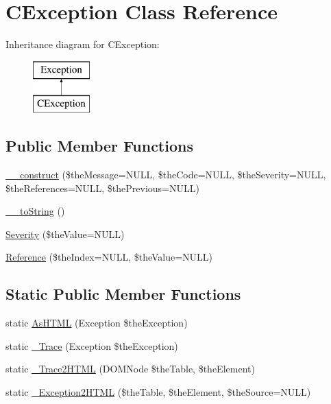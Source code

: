 \hypertarget{class_c_exception}{\section{C\-Exception Class Reference}
\label{class_c_exception}
}
Inheritance diagram for C\-Exception\-:\begin{figure}[H]
\begin{center}
\leavevmode
\includegraphics[height=2.000000cm]{class_c_exception}
\end{center}
\end{figure}
\subsection*{Public Member Functions}
\begin{DoxyCompactItemize}
\item 
\hyperlink{class_c_exception_aea9f2ae76b6058652dfb672ce1a78507}{\-\_\-\-\_\-construct} (\$the\-Message=N\-U\-L\-L, \$the\-Code=N\-U\-L\-L, \$the\-Severity=N\-U\-L\-L, \$the\-References=N\-U\-L\-L, \$the\-Previous=N\-U\-L\-L)
\item 
\hyperlink{class_c_exception_a06b1b207799f8a8ca27bc12d1be82b07}{\-\_\-\-\_\-to\-String} ()
\item 
\hyperlink{class_c_exception_a2bef90da8a35e80dda8072d4f748ec20}{Severity} (\$the\-Value=N\-U\-L\-L)
\item 
\hyperlink{class_c_exception_abcbd46a262790fcbe3493e30a6418821}{Reference} (\$the\-Index=N\-U\-L\-L, \$the\-Value=N\-U\-L\-L)
\end{DoxyCompactItemize}
\subsection*{Static Public Member Functions}
\begin{DoxyCompactItemize}
\item 
static \hyperlink{class_c_exception_a99be238dee92094374995eebe54df6a8}{As\-H\-T\-M\-L} (Exception \$the\-Exception)
\item 
static \hyperlink{class_c_exception_ad5f92d9c5d11443ce4b69aec6a8484d5}{\-\_\-\-Trace} (Exception \$the\-Exception)
\item 
static \hyperlink{class_c_exception_a643b0ad0d3d4faba071968c953d639af}{\-\_\-\-Trace2\-H\-T\-M\-L} (D\-O\-M\-Node \$the\-Table, \$the\-Element)
\item 
static \hyperlink{class_c_exception_a84a97fbcc2907c16a29a01adf841ee94}{\-\_\-\-Exception2\-H\-T\-M\-L} (\$the\-Table, \$the\-Element, \$the\-Source=N\-U\-L\-L)
\end{DoxyCompactItemize}
